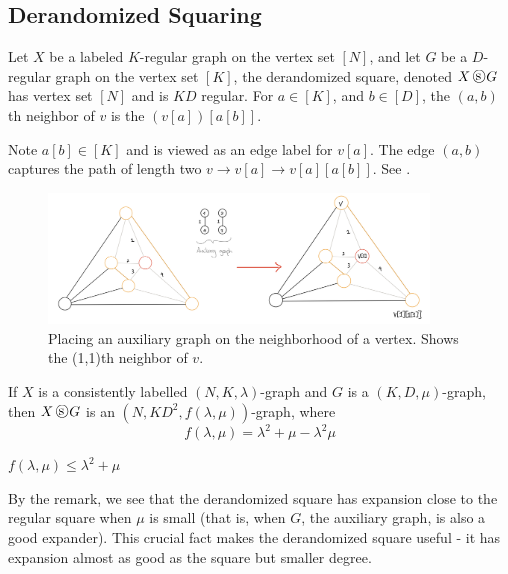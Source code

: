\documentclass{article}
\begin{document}
\subsection{Derandomized Squaring}
\begin{definition}
    Let $X$ be a labeled $K$-regular graph on the vertex set $[N]$, and let $G$ be a $D$-regular graph on the vertex set $[K]$, the derandomized square, denoted $X \dsquare G$ has vertex set $[N]$ and is $KD$ regular. For $a \in [K]$, and $b \in [D]$, the $(a, b)$th neighbor of $v$ is the $(v[a])[a[b]]$. 
\end{definition}

Note $a[b] \in [K]$ and is viewed as an edge label for $v[a]$. The edge $(a, b)$ captures the path of length two $v \to v[a] \to v[a][a[b]]$. See .

\begin{figure}
    \begin{center}
        \includegraphics[width=0.9\textwidth]{dsquare.png}
    \end{center}
    \caption{Placing an auxiliary graph on the neighborhood of a vertex. Shows the (1,1)th neighbor of $v$.}\label{dsquare}
\end{figure}


\begin{lemma}\label{lem:dsquare-expansion}
    If $X$ is a consistently labelled $(N, K, \lambda)$-graph and $G$ is a $(K, D, \mu)$-graph, then $X \dsquare G$ is an $(N, KD^2, f(\lambda, \mu))$-graph, where 
    $$
    f(\lambda, \mu) = \lambda^2 + \mu - \lambda^2\mu
    $$
\end{lemma}

\begin{remark}
$f(\lambda, \mu) \leq \lambda^2 + \mu$
\end{remark}

By the remark, we see that the derandomized square has expansion close to the regular square when $\mu$ is small (that is, when $G$, the auxiliary graph, is also a good expander). This crucial fact makes the derandomized square useful - it has expansion almost as good as the square but smaller degree.
\end{document}
